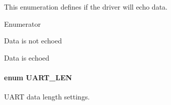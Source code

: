 This enumeration defines if the driver will echo data. \begin{Desc}
\item[Enumerator]\par
\begin{description}
\item[{\em 
U\+A\+R\+T\+\_\+\+E\+C\+H\+O\+\_\+\+O\+F\+F\label{_u_a_r_t_8h_aac6a03c2e1d76f53e1d9d923dcdc24f2a2b286f182793d4a71bdf99409b9600dd}
}]Data is not echoed \item[{\em 
U\+A\+R\+T\+\_\+\+E\+C\+H\+O\+\_\+\+O\+N\label{_u_a_r_t_8h_aac6a03c2e1d76f53e1d9d923dcdc24f2a6c4d8a2d4e30c22cf9fa45cd1bf79306}
}]Data is echoed \end{description}
\end{Desc}
\paragraph[{U\+A\+R\+T\+\_\+\+L\+E\+N}]{\setlength{\rightskip}{0pt plus 5cm}enum {\bf U\+A\+R\+T\+\_\+\+L\+E\+N}}\label{_u_a_r_t_8h_adf245d5f10db0abcbd8ad62a0d80c694}


U\+A\+R\+T data length settings. 

